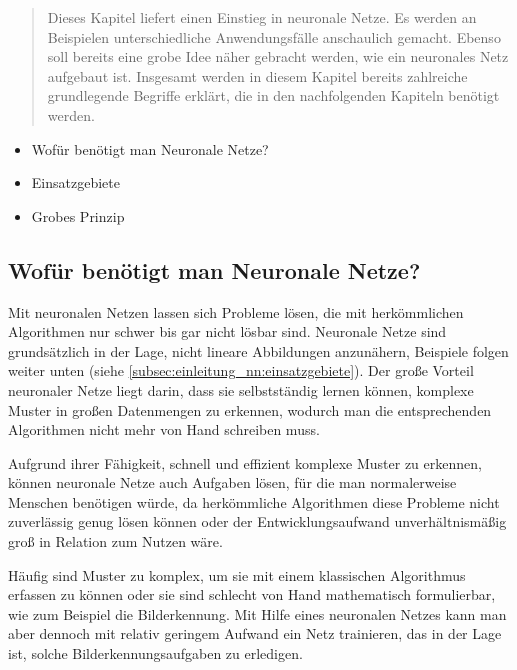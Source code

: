\begin{tcolorbox}[title={Inhalt}]
  \begin{quotation}\noindent
      Dieses Kapitel liefert einen Einstieg in neuronale Netze. Es werden an Beispielen unterschiedliche Anwendungsfälle anschaulich gemacht.
      Ebenso soll bereits eine grobe Idee näher gebracht werden, wie ein neuronales Netz aufgebaut ist.
      Insgesamt werden in diesem Kapitel bereits zahlreiche grundlegende Begriffe erklärt, die in den nachfolgenden Kapiteln benötigt werden.
  \end{quotation}
  \begin{itemize}  
    \item Wofür benötigt man Neuronale Netze?
    \item Einsatzgebiete
    \item Grobes Prinzip
  \end{itemize}
\end{tcolorbox}

\subsection{Wofür benötigt man Neuronale Netze?}\label{subsec:einleitung_nn:wofuer_nn}
Mit neuronalen Netzen lassen sich Probleme lösen, die mit herkömmlichen Algorithmen nur schwer bis gar nicht lösbar sind. Neuronale Netze sind grundsätzlich in der Lage, nicht lineare Abbildungen anzunähern, Beispiele folgen weiter unten (siehe \ref*{subsec:einleitung_nn:einsatzgebiete}).
Der große Vorteil neuronaler Netze liegt darin, dass sie selbstständig lernen können, komplexe Muster in großen Datenmengen zu erkennen, wodurch man die entsprechenden Algorithmen nicht mehr von Hand schreiben muss.

\bigbreak\noindent
Aufgrund ihrer Fähigkeit, schnell und effizient komplexe Muster zu erkennen, können neuronale Netze auch Aufgaben lösen, für die man normalerweise Menschen benötigen würde, da herkömmliche Algorithmen diese Probleme nicht zuverlässig genug lösen können oder der Entwicklungsaufwand unverhältnismäßig groß in Relation zum Nutzen wäre.

\bigbreak\noindent
Häufig sind Muster zu komplex, um sie mit einem klassischen Algorithmus erfassen zu können oder sie sind schlecht von Hand mathematisch formulierbar, wie zum Beispiel die Bilderkennung.
Mit Hilfe eines neuronalen Netzes kann man aber dennoch mit relativ geringem Aufwand ein Netz trainieren, das in der Lage ist, solche Bilderkennungsaufgaben zu erledigen.

